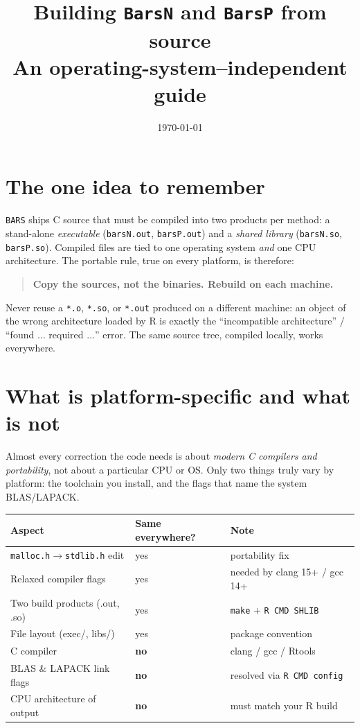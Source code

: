 \documentclass[11pt]{article}
\title{\textbf{Building \texttt{BarsN} and \texttt{BarsP} from source\\
\large An operating-system--independent guide}}
\author{}
\date{\today}
\begin{document}
\maketitle

\section{The one idea to remember}

\texttt{BARS} ships C source that must be compiled into two products per method:
a stand-alone \emph{executable} (\texttt{barsN.out}, \texttt{barsP.out}) and a
\emph{shared library} (\texttt{barsN.so}, \texttt{barsP.so}). Compiled files are
tied to one operating system \emph{and} one CPU architecture. The portable rule,
true on every platform, is therefore:

\begin{quote}
\textbf{Copy the sources, not the binaries. Rebuild on each machine.}
\end{quote}

Never reuse a \texttt{*.o}, \texttt{*.so}, or \texttt{*.out} produced on a
different machine: an object of the wrong architecture loaded by R is exactly the
``incompatible architecture'' / ``found $\ldots$ required $\ldots$'' error. The
same source tree, compiled locally, works everywhere.

\section{What is platform-specific and what is not}

Almost every correction the code needs is about \emph{modern C compilers and
portability}, not about a particular CPU or OS. Only two things truly vary by
platform: the toolchain you install, and the flags that name the system BLAS/LAPACK.

\begin{center}
\begin{tabular}{@{}lll@{}}
\toprule
\textbf{Aspect} & \textbf{Same everywhere?} & \textbf{Note} \\
\midrule
\texttt{malloc.h}$\rightarrow$\texttt{stdlib.h} edit & yes & portability fix \\
Relaxed compiler flags        & yes & needed by clang 15+ / gcc 14+ \\
Two build products (.out, .so)& yes & \texttt{make} + \texttt{R CMD SHLIB} \\
File layout (exec/, libs/)    & yes & package convention \\
\midrule
C compiler                    & \textbf{no} & clang / gcc / Rtools \\
BLAS \& LAPACK link flags      & \textbf{no} & resolved via \texttt{R CMD config} \\
CPU architecture of output    & \textbf{no} & must match your R build \\
\bottomrule
\end{tabular}
\end{center}
\end{document}

